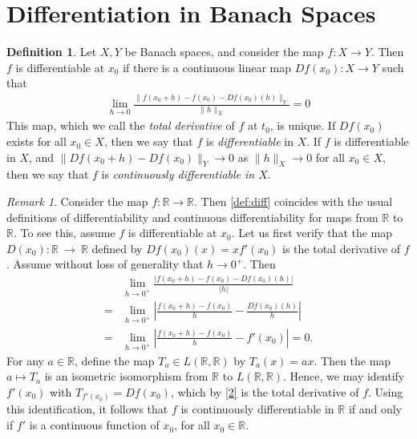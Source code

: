 \documentclass[12pt,reqno]{amsart}
\numberwithin{equation}{section}  %
\numberwithin{figure}{section}
\newcommand{\rr}{\mathbb{R}}
\theoremstyle{plain}
\theoremstyle{definition}
\newtheorem{definition}{Definition}
\theoremstyle{remark}
\newtheorem{remark}{Remark}
\begin{document}
\section{Differentiation in Banach Spaces}
\begin{definition}
	\label{def:diff}
	Let $X,Y$ be Banach spaces, and consider the map $f: X \to Y$.
	Then $f$ is differentiable at $x_0$ if there
	is a continuous linear map $Df(x_0): X \to Y$ such that
	\begin{equation}
		\label{diff-limit}
		\begin{split}
			\lim_{h \to 0} \frac{\|f(x_0+ h) - f(x_0) -
			Df(x_0)(h) \|_Y}{\|h\|_{X}} = 0
		\end{split}
	\end{equation}
	This map, which we call the \emph{total derivative} of $f$ at $t_0$, is 
	unique. If $Df(x_0)$ exists for all $x_0 \in X$,
	then we say that $f$ is
	\emph{differentiable} in $X$. If $f$ is differentiable in $X$, and 
	$\|Df(x_0 + h) - Df(x_0) \|_Y \to 0$ as $\|h\|_{X} \to 0$ for all $x_0 \in X$,
	then we say that $f$ is \emph{continuously differentiable in $X$}. 	
\end{definition}
	\begin{remark}
		\label{rem:usual-diff}
		Consider the map $f: \rr \to \rr$. Then \autoref{def:diff} 
		coincides with the usual definitions of
		differentiability and continuous differentiability for maps
		from $\rr $ to $\rr$.
		To see this, assume $f$ is differentiable at $x_0$.
		Let us first verify that the map  $D(x_0): \rr ~\to~\rr$
		defined by $Df(x_0)(x) =
		xf'(x_0)$ is the total derivative of $f$. Assume without loss of generality
		that $h \to 0^+$. Then
		\begin{equation}
			\label{2}
			\begin{split}
				& \lim_{h \to 0^+} \frac{| f( x_0 + h) - f(x_0) -
				Df(x_0)(h) |}{|h|}
				\\
				= & \lim_{h\to 0^+} \left |\frac{f(x_0+h) -
				f(x_0)}{h} - \frac{Df(x_0)(h)}{h}  \right |
				\\
				= & \lim_{h \to 0^+} \left |\frac{f(x_0+h) - f(x_0)}{h} -
				f'(x_0) \right | = 0.
			\end{split}
		\end{equation}
%
%
For any $a \in \rr$, define the map $T_{a} \in L(\rr , \rr)$ by
$T_{a}(x) = ax$. Then the map $a \mapsto T_a$ is an isometric
isomorphism from $\rr$ to $L( \rr, \rr)$. Hence, 
we may identify $f'(x_0)$ with $T_{f'(x_0)} = Df(x_0)$,
which by \eqref{2} is the total derivative of $f$.  Using this identification,
it follows that $f$ is continuously
differentiable in $\rr$ if and only if $f'$ is a continuous function of
$x_0$, for all $x_0 \in \rr$. \qquad \qedsymbol
%
\end{remark}
\end{document}
